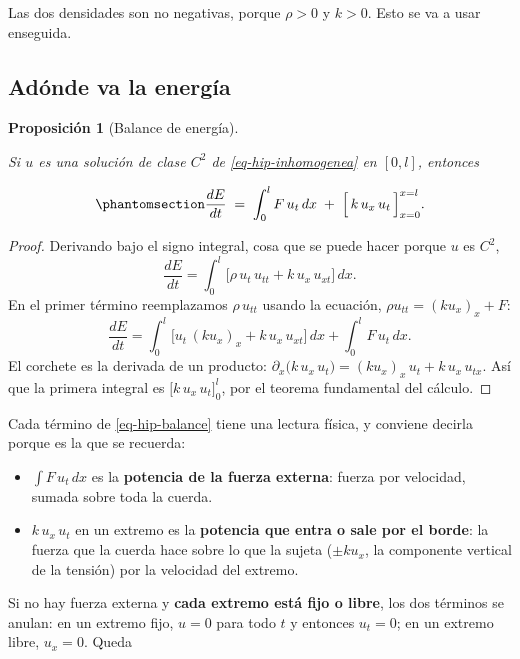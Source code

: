 \documentclass[
  spanish,
  a4paper,
]{scrbook}
\providecommand{\tightlist}{%
  \setlength{\itemsep}{0pt}\setlength{\parskip}{0pt}}
\theoremstyle{definition}
\theoremstyle{plain}
\newtheorem{proposition}{Proposición}[chapter]
\theoremstyle{definition}
\theoremstyle{plain}
\theoremstyle{definition}
\theoremstyle{remark}
\begin{document}
Las dos densidades son no negativas, porque \(\rho>0\) y \(k>0\). Esto
se va a usar enseguida.

\subsection{Adónde va la energía}\label{sec-hip-balance}

\begin{proposition}[Balance de
energía]\protect\hypertarget{prp-hip-balance}{}\label{prp-hip-balance}

Si \(u\) es una solución de clase \(C^2\) de \ref{eq-hip-inhomogenea} en
\([0,l]\), entonces

\begin{equation}\protect\phantomsection\label{eq-hip-balance}{
\frac{dE}{dt} \;=\; \int_0^l F\,u_t\,dx \;+\; \Big[\,k\,u_x\,u_t\,\Big]_{x=0}^{x=l} .
}\end{equation}

\end{proposition}

\begin{proof}
Derivando bajo el signo integral, cosa que se puede hacer porque \(u\)
es \(C^2\), \[
\frac{dE}{dt} = \int_0^l \big[\rho\,u_t\,u_{tt} + k\,u_x\,u_{xt}\big]\,dx .
\] En el primer término reemplazamos \(\rho\,u_{tt}\) usando la
ecuación, \(\rho u_{tt} = (k u_x)_x + F\): \[
\frac{dE}{dt} = \int_0^l \big[u_t\,(k u_x)_x + k\,u_x\,u_{xt}\big]\,dx + \int_0^l F\,u_t\,dx .
\] El corchete es la derivada de un producto:
\(\partial_x\big(k\,u_x\,u_t\big) = (k u_x)_x\,u_t + k\,u_x\,u_{tx}\).
Así que la primera integral es \(\big[k\,u_x\,u_t\big]_0^l\), por el
teorema fundamental del cálculo.
\end{proof}

Cada término de \ref{eq-hip-balance} tiene una lectura física, y
conviene decirla porque es la que se recuerda:

\begin{itemize}
\tightlist
\item
  \(\int F\,u_t\,dx\) es la \textbf{potencia de la fuerza externa}:
  fuerza por velocidad, sumada sobre toda la cuerda.
\item
  \(k\,u_x\,u_t\) en un extremo es la \textbf{potencia que entra o sale
  por el borde}: la fuerza que la cuerda hace sobre lo que la sujeta
  (\(\pm k u_x\), la componente vertical de la tensión) por la velocidad
  del extremo.
\end{itemize}

Si no hay fuerza externa y \textbf{cada extremo está fijo o libre}, los
dos términos se anulan: en un extremo fijo, \(u=0\) para todo \(t\) y
entonces \(u_t=0\); en un extremo libre, \(u_x=0\). Queda
\end{document}
